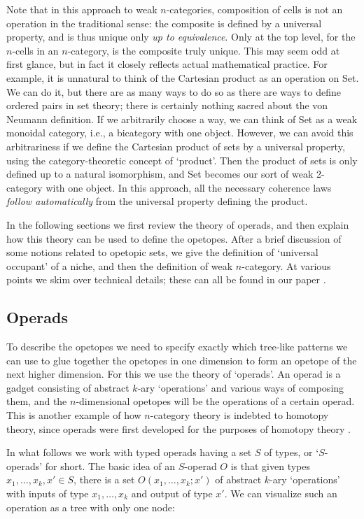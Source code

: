 Note that in this approach to weak $n$-categories, composition of cells
is not an operation in the traditional sense: the composite is defined
by a universal property, and is thus unique only {\it up to
equivalence}.  Only at the top level, for the $n$-cells in an
$n$-category, is the composite truly unique.  This may seem odd at first
glance, but in fact it closely reflects actual mathematical practice.
For example, it is unnatural to think of the Cartesian product as an
operation on Set.  We can do it, but there are as many ways to do so as
there are ways to define ordered pairs in set theory; there is certainly
nothing sacred about the von Neumann definition.  If we arbitrarily
choose a way, we can think of Set as a weak monoidal category, i.e., a
bicategory with one object.  However, we can avoid this arbitrariness if
we define the Cartesian product of sets by a universal property, using
the category-theoretic concept of `product'.  Then the product of sets
is only defined up to a natural isomorphism, and Set becomes our sort of
weak 2-category with one object.  In this approach, all the necessary 
coherence laws {\it follow automatically} from the universal property
defining the product.  

In the following sections we first review the theory of operads,
and then explain how this theory can be used to define the opetopes.
After a brief discussion of some notions related to opetopic sets, we
give the definition of `universal occupant' of a niche, and then the
definition of weak $n$-category.  At various points we skim over
technical details; these can all be found in our paper \cite{BD2}.

\subsection{Operads}

To describe the opetopes we need to specify exactly which tree-like
patterns we can use to glue together the opetopes in one dimension to
form an opetope of the next higher dimension.  For this we use the
theory of `operads'.  An operad is a gadget consisting of abstract
$k$-ary `operations' and various ways of composing them, and the
$n$-dimensional opetopes will be the operations of a certain operad.
This is another example of how $n$-category theory is indebted to
homotopy theory, since operads were first developed for the purposes of
homotopy theory \cite{Adams,BV,May}.

In what follows we work with typed operads having a set $S$ of types,
or `$S$-operads' for short.  The basic idea of an $S$-operad $O$ is that
given types $x_1,\dots,x_k,x' \in S$, there is a set
$O(x_1,\dots,x_k;x')$ of abstract $k$-ary `operations' with inputs of
type $x_1,\dots,x_k$ and output of type $x'$.  We can visualize such an
operation as a tree with only one node:

